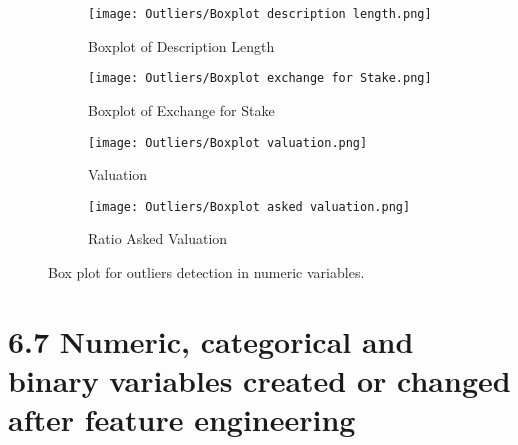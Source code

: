\documentclass{article}
\begin{document}
\begin{figure}[H]
    \centering
    \begin{subfigure}[b]{0.45\textwidth}
        \texttt{[image: Outliers/Boxplot description length.png]} %
        \caption{Boxplot of Description Length}
        \label{fig:description_length_boxplot}
    \end{subfigure}
    \hfill
    \begin{subfigure}[b]{0.45\textwidth}
        \texttt{[image: Outliers/Boxplot exchange for Stake.png]} %
        \caption{Boxplot of Exchange for Stake}
        \label{fig:exchangeForStake_boxplot}
    \end{subfigure}

    \begin{subfigure}[b]{0.45\textwidth}
        \texttt{[image: Outliers/Boxplot valuation.png]} %
        \caption{Valuation}
        \label{fig:valuation_boxplot}
    \end{subfigure}
    \hfill
    \begin{subfigure}[b]{0.45\textwidth}
        \texttt{[image: Outliers/Boxplot asked valuation.png]} %
        \caption{Ratio Asked Valuation}
        \label{fig:ratio_asked_valuation_boxplot}
    \end{subfigure}

    \caption{Box plot for outliers detection in numeric variables.}
    \label{fig:box_plots_outliers}
\end{figure}

\section*{6.7 Numeric, categorical and binary variables created or changed after feature engineering}
\end{document}
